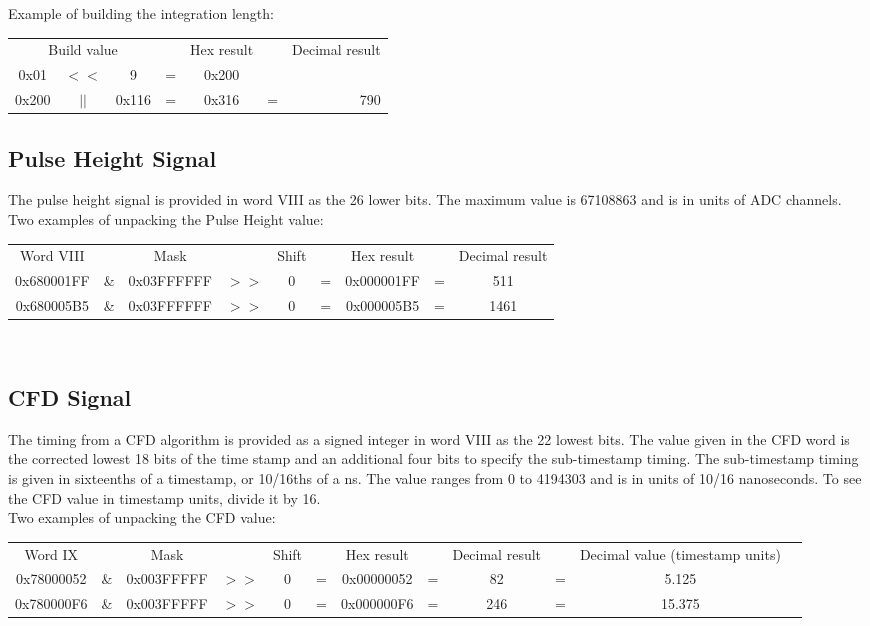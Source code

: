 \documentclass[letterpaper,12pt,notitlepage]{report}
\begin{document}
Example of building the integration length:\\

\begin{tabular}{ccccccr}
\multicolumn{3}{c}{Build value} & & Hex result & & Decimal result\\
0x01 & $<<$ & 9 & = & 0x200\\
0x200 & $||$ & 0x116 & = & 0x316 & = & 790\\
\end{tabular}

\subsection{Pulse Height Signal}
The pulse height signal is provided in word VIII as the 26 lower bits. The maximum value is 67108863 and is in units of ADC channels.\\

Two examples of unpacking the Pulse Height value:\\

\begin{tabular}{ccccccccc}
Word VIII &  & Mask & & Shift & & Hex result & & Decimal result\\
0x680001FF & \& & 0x03FFFFFF & $>>$ & 0 & = & 0x000001FF & = & 511\\
0x680005B5 & \& & 0x03FFFFFF & $>>$ & 0 & = & 0x000005B5 & = & 1461\\
\end{tabular}\\

\subsection{CFD Signal}
The timing from a CFD algorithm is provided as a signed integer in word VIII as the 22 lowest bits. The value given in the CFD word is the corrected lowest 18 bits of the time stamp and an additional four bits to specify the sub-timestamp timing. The sub-timestamp timing is given in sixteenths of a timestamp, or 10/16ths of a ns. The value ranges from 0 to 4194303 and is in units of 10/16 nanoseconds. To see the CFD value in timestamp units, divide it by 16.\\

Two examples of unpacking the CFD value:\\

\begin{tabular}{cccccccccccc}
Word IX &  & Mask & & Shift & & Hex result & & Decimal result & & Decimal value (timestamp units)\\
0x78000052 & \& & 0x003FFFFF & $>>$ & 0 & = & 0x00000052 & = & 82 & = & 5.125\\
0x780000F6 & \& & 0x003FFFFF & $>>$ & 0 & = & 0x000000F6 & = & 246 & = & 15.375\\
\end{tabular}\\
\end{document}
